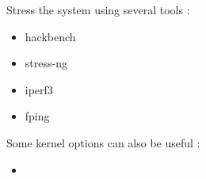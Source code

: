 Stress the system using several tools :

\begin{itemize}
	\item hackbench
	\item stress-ng
	\item iperf3
	\item fping
\end{itemize}

Some kernel options can also be useful :
\begin{itemize}
	\item {}
\end{itemize}
